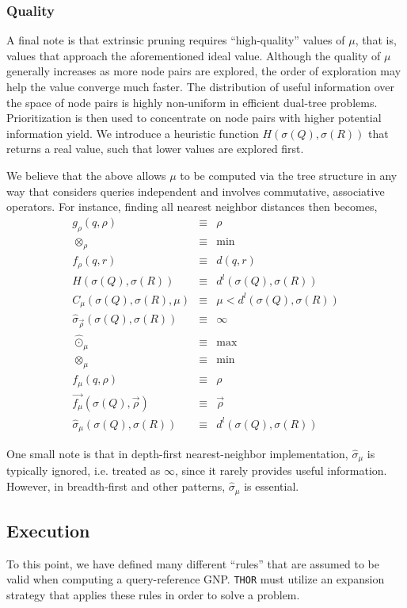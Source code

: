 \documentclass[twoside,leqno,twocolumn]{article}
\newcommand{\THOR}{{{\tt THOR}} }
\newcommand{\summary}{\hat{\sigma}}
\newcommand{\mysubsub}[1]{\subsubsection{#1} }
\newcommand{\lo}[1]{#1^{l}}
\newcommand{\distlo}{\lo{d}}
\newcommand{\dist}[2]{d(#1,#2)}
\newcommand{\nameop}[2]{{\scriptstyle\:}#1_{\!#2}}
\newcommand{\myop}[1]{\nameop{\otimes}{#1}}
\newcommand{\letterqr}{\rho}
\newcommand{\inqr}{\rho}
\newcommand{\opqr}{\myop{\letterqr}}
\newcommand{\fqr}{f_{\!\letterqr}}
\newcommand{\gqr}{g_{\!\letterqr}}
\newcommand{\letterqrv}{\vec{\rho}}
\newcommand{\deltaqrv}{\summary_{\!\letterqrv}}
\newcommand{\lettermu}{\mu}
\newcommand{\inmu}{\mu}
\newcommand{\outopmu}{\:\widehat{\odot}_{\!\mu}\:}
\newcommand{\opmu}{\myop{\lettermu}}
\newcommand{\fmu}{f_{\!\lettermu}}
\newcommand{\fmuv}{\vec{f_{\!\lettermu}}}
\newcommand{\deltamu}{\summary_{\!\lettermu}}
\newcommand{\canprunemu}{C_{\!\lettermu}}
\newcommand{\heurqr}{H}
\newcommand{\outstat}{\sigma}
\begin{document}
\mysubsub{Quality}
A final note is that extrinsic pruning requires ``high-quality'' values of $\inmu$, that is, values that approach the aforementioned ideal value.
Although the quality of $\lettermu$ generally increases as more node pairs are explored, the order of exploration may help the value converge much faster.
The distribution of useful information over the space of node pairs is highly non-uniform in efficient dual-tree problems.
Prioritization is then used to concentrate on node pairs with higher potential information yield.
We introduce a heuristic function $\heurqr(\outstat(Q),\outstat(R))$ that returns a real value, such that lower values are explored first.

We believe that the above allows $\lettermu$ to be computed via the tree structure in any way that considers queries independent and involves commutative, associative operators.
For instance, finding all nearest neighbor distances then becomes,
\begin{eqnarray*}
\gqr(q, \inqr) &\equiv& \inqr
\\
\opqr &\equiv& \min
\\
\fqr(q,r) &\equiv& \dist{q}{r}
\\
\heurqr(\outstat(Q),\outstat(R)) &\equiv& \distlo(\outstat(Q), \outstat(R))
\\
\canprunemu(\outstat(Q), \outstat(R), \lettermu)
 &\equiv& \lettermu < \distlo(\outstat(Q), \outstat(R))
\\
\deltaqrv(\outstat(Q),\outstat(R)) &\equiv& \infty
\\
\outopmu &\equiv& \max
\\
\opmu &\equiv& \min
\\
\fmu(q, \letterqr) &\equiv& \letterqr
\\
\fmuv(\outstat(Q), \letterqrv) &\equiv& \letterqrv
\\
\deltamu(\outstat(Q),\outstat(R)) &\equiv& \distlo(\outstat(Q),\outstat(R))
\end{eqnarray*}

\noindent One small note is that in depth-first nearest-neighbor implementation, $\deltamu$ is typically ignored, i.e. treated as $\infty$, since it rarely provides useful information.
However, in breadth-first and other patterns, $\deltamu$ is essential.

\subsection{Execution}

To this point, we have defined many different ``rules'' that are assumed to be valid when computing a query-reference GNP.
\THOR must utilize an expansion strategy that applies these rules in order to solve a problem.
\end{document}
